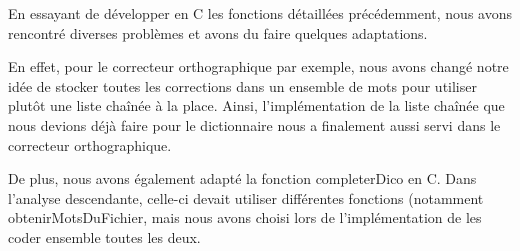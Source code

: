     En essayant de développer en C les fonctions détaillées précédemment, nous avons rencontré diverses problèmes et avons du faire quelques adaptations.

    En effet, pour le correcteur orthographique par exemple, nous avons changé notre idée de stocker toutes les corrections dans un ensemble de mots pour utiliser plutôt une liste chaînée à la place.
    Ainsi, l'implémentation de la liste chaînée que nous devions déjà faire pour le dictionnaire nous a finalement aussi servi dans le correcteur orthographique.

    De plus, nous avons également adapté la fonction completerDico en C. Dans l'analyse descendante, celle-ci devait utiliser différentes fonctions (notamment obtenirMotsDuFichier, mais nous avons choisi lors de l'implémentation de les coder ensemble toutes les deux.